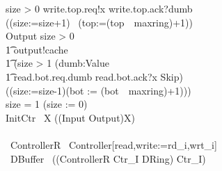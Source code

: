 \documentclass{llncs}
\begin{document}
\begin{circus}
                    \extchoice \lcircguard size > 0 \rcircguard \circguard
                            write.top.req!x \then write.top.ack?dumb \then \\
                            ((size:=size+1) \circseq\ (top:=(top~\mod~maxring)+1))
        \\
        Output \circdef
            \lcircguard size > 0 \rcircguard \circguard \\
            \t1
                output!cache \then \\
                \t1
                    (\lcircguard size > 1 \rcircguard \circguard
                                            (\IntChoice dumb:Value \circspot \\
                                                \t1 read.bot.req.dumb \then read.bot.ack?x \then Skip) \circseq\ \\
                                            ((size:=size-1)\circseq (bot := (bot~\mod~maxring)+1)))
                    \\
                    \extchoice \lcircguard size = 1 \rcircguard \circguard (size := 0)
        \\
        \circspot InitCtr \circseq\ \circmu X \circspot ((Input \extchoice Output)\circseq X)
    \\
    \circend
    \\
    \circprocess\ ControllerR \circdef\ Controller[read,write:=rd\_i,wrt\_i]
    \\
    \circprocess\ DBuffer \circdef\ ((ControllerR \lpar Ctr\_I \rpar DRing) \circhide Ctr\_I)
\end{circus}%
\end{document}
